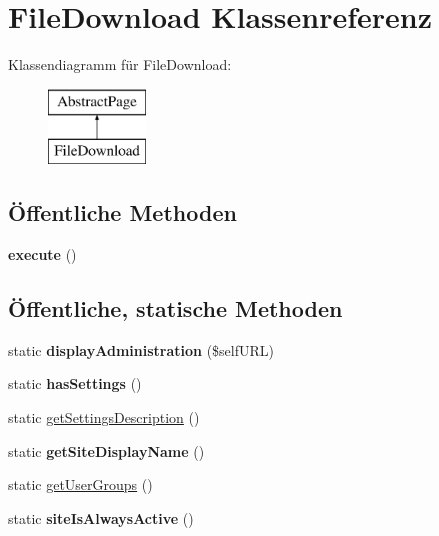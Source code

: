 \hypertarget{class_file_download}{}\section{File\+Download Klassenreferenz}
\label{class_file_download}
Klassendiagramm für File\+Download\+:\begin{figure}[H]
\begin{center}
\leavevmode
\includegraphics[height=2.000000cm]{class_file_download}
\end{center}
\end{figure}
\subsection*{Öffentliche Methoden}
\begin{DoxyCompactItemize}
\item 
\mbox{\label{class_file_download_aac420a707f2772c18f2693eb6d6fa00d}} 
{\bfseries execute} ()
\end{DoxyCompactItemize}
\subsection*{Öffentliche, statische Methoden}
\begin{DoxyCompactItemize}
\item 
\mbox{\label{class_file_download_ad998f1352ebcef973d94fe71850c5d83}} 
static {\bfseries display\+Administration} (\$self\+U\+RL)
\item 
\mbox{\label{class_file_download_a6e7f937b189ced6ed4830ad8a5833165}} 
static {\bfseries has\+Settings} ()
\item 
static \mbox{\hyperlink{class_file_download_a6083b324054d898cc2b61f5fb03caea4}{get\+Settings\+Description}} ()
\item 
\mbox{\label{class_file_download_a591c5d0ce9b7306a937f79634c5465f7}} 
static {\bfseries get\+Site\+Display\+Name} ()
\item 
static \mbox{\hyperlink{class_file_download_a7e2b4eaaff2303c3dd5d24f719ad2eb2}{get\+User\+Groups}} ()
\item 
\mbox{\label{class_file_download_aebcfeb20559f214377238a54b4cb9f8b}} 
static {\bfseries site\+Is\+Always\+Active} ()
\end{DoxyCompactItemize}
